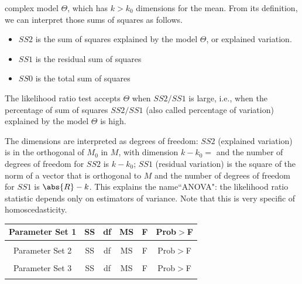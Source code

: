 complex model $\Theta$, which has $k >k_0$ dimensions for the
mean. From its definition, we can interpret those sums of
squares as follows.
\begin{itemize}
  \item $SS2$ is the sum of squares explained by the model
      $\Theta$, or explained variation.
  \item $SS1$ is the residual sum of squares
\item $SS0$ is the total sum of squares
\end{itemize}
  The likelihood ratio test accepts $\Theta$ when $SS2/SS1$ is large, i.e., when the
percentage of sum of squares $SS2/SS1$ (also called percentage
of variation) explained by the model $\Theta$ is high.

The dimensions are interpreted as degrees of
  freedom: $SS2$ (explained variation) is in the orthogonal of
      $M_0$ in $M$, with dimension $k-k_0=$ and the number of
      degrees of freedom for $SS2$ is $k-k_0$; $SS1$ (residual variation) is the square of
      the norm of a vector that is orthogonal to
      $M$ and the number of degrees of freedom
      for $SS1$ is $\abs{R}-k$.
This explains the name``ANOVA": the likelihood ratio statistic
depends only on estimators of variance. Note that this is very
specific of homoscedasticity.
\begin{table}
 \center
  \begin{tabular}{c|c|c|c|c|c}\hline
     Parameter Set 1 & SS & df & MS & F & Prob$>$F \\ \hline
    \\
    \hline
  \hline
     Parameter Set 2 & SS & df & MS & F & Prob$>$F \\ \hline
    \\
    \hline
  \hline
     Parameter Set 3 & SS & df & MS & F & Prob$>$F \\ \hline
    \\
    \hline
  \end{tabular}\\
\end{table}
